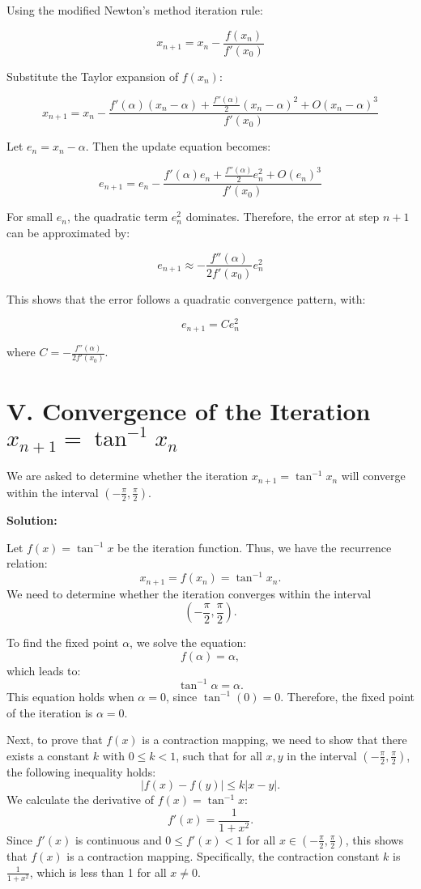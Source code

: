 \documentclass[a4paper]{article}
\begin{document}
Using the modified Newton’s method iteration rule:

\[
x_{n+1} = x_n - \frac{f(x_n)}{f'(x_0)}
\]

Substitute the Taylor expansion of \( f(x_n) \):

\[
x_{n+1} = x_n - \frac{f'(\alpha)(x_n - \alpha) + \frac{f''(\alpha)}{2}(x_n - \alpha)^2+ O(x_n - \alpha)^3}{f'(x_0)}
\]

Let \( e_n = x_n - \alpha \). Then the update equation becomes:

\[
e_{n+1} = e_n - \frac{f'(\alpha)e_n + \frac{f''(\alpha)}{2}e_n^2+ O(e_n)^3}{f'(x_0)}
\]


For small \( e_n \), the quadratic term \( e_n^2 \) dominates. Therefore, the error at step \( n+1 \) can be approximated by:

\[
e_{n+1} \approx - \frac{f''(\alpha)}{2 f'(x_0)} e_n^2
\]

This shows that the error follows a quadratic convergence pattern, with:

\[
e_{n+1} = C e_n^2
\]

where \( C = - \frac{f''(\alpha)}{2 f'(x_0)} \).

\section*{V. Convergence of the Iteration $x_{n+1} = \tan^{-1}x_n$}

We are asked to determine whether the iteration $x_{n+1} = \tan^{-1} x_n$ will converge within the interval $\left(-\frac{\pi}{2}, \frac{\pi}{2}\right).$


\textbf{Solution:}

Let $f(x) = \tan^{-1} x$ be the iteration function. Thus, we have the recurrence relation:
\[
x_{n+1} = f(x_n) = \tan^{-1} x_n.
\]
We need to determine whether the iteration converges within the interval 
\[
\left(-\frac{\pi}{2}, \frac{\pi}{2}\right).
\]

To find the fixed point $\alpha$, we solve the equation:
\[
f(\alpha) = \alpha,
\]
which leads to:
\[
\tan^{-1} \alpha = \alpha.
\]
This equation holds when $\alpha = 0$, since $\tan^{-1}(0) = 0$. Therefore, the fixed point of the iteration is $\alpha = 0$.

Next, to prove that $f(x)$ is a contraction mapping, we need to show that there exists a constant $k$ with $0 \leq k < 1$, such that for all $x, y$ in the interval $\left(-\frac{\pi}{2}, \frac{\pi}{2}\right)$, the following inequality holds:
\[
|f(x) - f(y)| \leq k |x - y|.
\]
We calculate the derivative of $f(x) = \tan^{-1}x$:
\[
f'(x) = \frac{1}{1 + x^2}.
\]
Since $f'(x)$ is continuous and $0 \leq f'(x) < 1$ for all $x \in \left(-\frac{\pi}{2}, \frac{\pi}{2}\right)$, this shows that $f(x)$ is a contraction mapping. Specifically, the contraction constant $k$ is $\frac{1}{1 + x^2}$, which is less than 1 for all $x \neq 0$.
\end{document}
